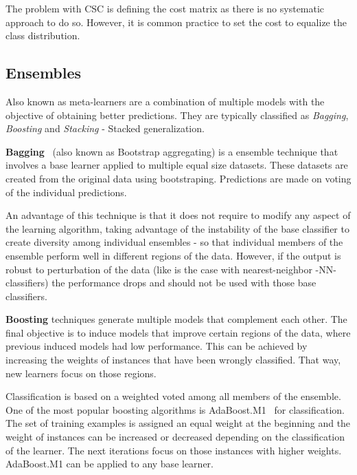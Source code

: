 The problem with CSC is defining the cost matrix as there is no systematic 
approach to do so. However, it is common practice to set the cost to equalize 
the class distribution.

\subsection{Ensembles}\label{sec:ensembles}

Also known as meta-learners are a combination of multiple models with the 
objective of obtaining better predictions. They are typically classified as 
\emph{Bagging}, \emph{Boosting} and \emph{\emph{Stacking}} - Stacked 
generalization.


\textbf{Bagging}~\cite{Breiman96} (also known as Bootstrap aggregating) is a 
ensemble technique that involves a base learner applied to multiple equal size 
datasets. These datasets are created from the original data using bootstraping. 
Predictions are made on voting of the individual predictions. 

An advantage of this technique is that it does not require to modify
any aspect of the learning algorithm, taking advantage of the instability of 
the base classifier to create diversity among individual ensembles - so that 
individual members of the ensemble perform well in different regions of the 
data. However, if the output is robust to perturbation of the data (like is the 
case with nearest-neighbor -NN- classifiers) the performance drops and should 
not be used with those base classifiers.


\textbf{Boosting} techniques generate multiple models that complement each 
other. The final objective is to induce models that improve certain regions of 
the data, where previous induced models had low performance. This can be 
achieved by increasing the weights of instances that have been wrongly 
classified. That way, new learners focus on those regions. 

Classification is based on a weighted voted among all members of the ensemble.
One of the most popular boosting algorithms is AdaBoost.M1~\cite{Freund1996} 
for classification. The set of training examples is assigned an equal weight at 
the beginning and the weight of instances can be increased or decreased 
depending on the classification of the learner. The next iterations focus on 
those instances with higher weights. AdaBoost.M1 can be applied to any base 
learner.

